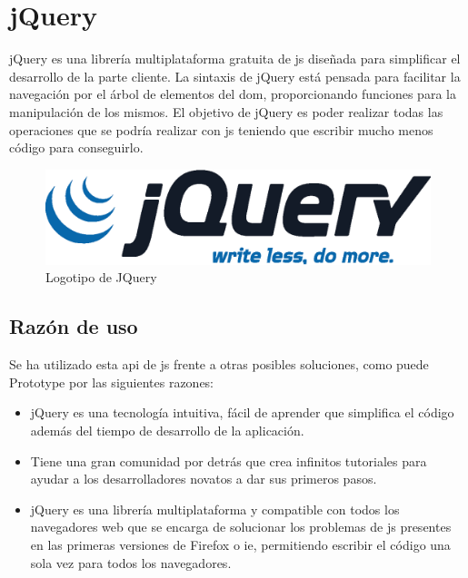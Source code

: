 \section{jQuery}

jQuery\cite{jQuery} es una librería multiplataforma gratuita de \acrfull{js} diseñada para simplificar el desarrollo de la parte cliente. La sintaxis de jQuery está pensada para facilitar la navegación por el árbol de elementos del \acrfull{dom}, proporcionando funciones para la manipulación de los mismos. El objetivo de jQuery es poder realizar todas las operaciones que se podría realizar con \acrshort{js} teniendo que escribir mucho menos código para conseguirlo.

\begin{figure}[!htbp]
	\centering
	\includegraphics[scale=0.6]{fig/jquery_logo}
	\caption{Logotipo de JQuery}
\end{figure}

\subsection{Razón de uso}

Se ha utilizado esta \acrshort{api} de \acrshort{js} frente a otras posibles soluciones, como puede Prototype\cite{Prototype} por las siguientes razones:

\begin{itemize}
	\item jQuery es una tecnología intuitiva, fácil de aprender que simplifica el código además del tiempo de desarrollo de la aplicación.
	\item Tiene una gran comunidad por detrás que crea infinitos tutoriales para ayudar a los desarrolladores novatos a dar sus primeros pasos.
	\item jQuery es una librería multiplataforma y compatible con todos los navegadores web que se encarga de solucionar los problemas de \acrshort{js} presentes en las primeras versiones de Firefox\cite{Firefox} o \acrfull{ie}\cite{IE}, permitiendo escribir el código una sola vez para todos los navegadores.
\end{itemize}

